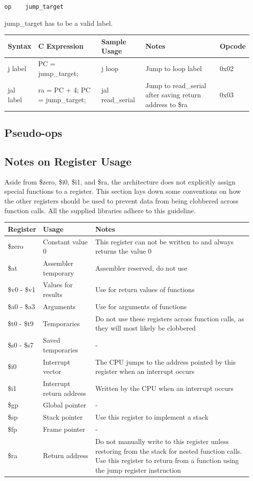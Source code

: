 \documentclass{article}
\begin{document}
\begin{verbatim}
op    jump_target
\end{verbatim}

jump\_target has to be a valid label. 

\begin{tabular}{| l | l | l | p{5cm} | l |}
\hline
Syntax & C Expression & Sample Usage & Notes & Opcode \\
\hline
j label & PC = jump\_target; & j loop & Jump to loop label & 0x02 \\
jal label & ra = PC + 4; PC = jump\_target; & jal read\_serial & Jump to read\_serial after saving return address to \$ra & 0x03 \\
\hline
\end{tabular}

\subsection{Pseudo-ops}
\subsection{Notes on Register Usage}
Aside from \$zero, \$i0, \$i1, and \$ra, the architecture does not explicitly assign special functions to a register. This section lays down some conventions on how the other registers should be used to prevent data from being clobbered across function calls. All the supplied libraries adhere to this guideline. 

\begin{tabular}{| l | l | p{8cm} |}
\hline
Register & Usage & Notes \\
\hline
\$zero	& Constant value 0 & This register can not be written to and always returns the value 0 \\
\$at	& Assembler temporary &	Assembler reserved, do not use \\
\$v0 - \$v1 &	Values for results &	Use for return values of functions \\
\$a0 - \$a3 &	Arguments &	Use for arguments of functions \\
\$t0 - \$t9 &	Temporaries &	Do not use these registers across function calls, as they will most likely be clobbered \\
\$s0 - \$s7 &	Saved temporaries &	- \\
\$i0 &	Interrupt vector &	The CPU jumps to the address pointed by this register when an interrupt occurs \\
\$i1 &	Interrupt return address &	Written by the CPU when an interrupt occurs \\
\$gp &	Global pointer &	- \\
\$sp &	Stack pointer &	Use this register to implement a stack \\
\$fp &	Frame pointer & - \\
\$ra &	Return address & Do not manually write to this register unless restoring from the stack for nested function calls. Use this register to return from a function using the jump register instruction \\
\hline
\end{tabular}
\end{document}

